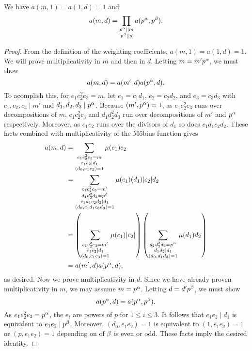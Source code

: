 \documentclass[12pt,reqno,oneside]{amsart}
\begin{document}
    \begin{proposition}\label{prop:multiplicativity_of_weighting_coefficients}
        We have $a(m,1) = a(1,d) = 1$ and
        \[
            a(m,d) = \prod_{\substack{p^{\alpha} \mid\mid m \\ p^{\beta} \mid\mid d}}a(p^{\alpha},p^{\beta}).
        \]
    \end{proposition}
    \begin{proof}
        From the definition of the weighting coefficients, $a(m,1) = a(1,d) = 1$. We will prove multiplicativity in $m$ and then in $d$. Letting $m = m'p^{\alpha}$, we must show
        \[
            a(m,d) = a(m',d)a(p^{\alpha},d).
        \]
        To acomplish this, for $e_{1}e_{2}^{2}e_{3} = m$, let $e_{1} = c_{1}d_{1}$, $e_{2} = c_{2}d_{2}$, and $e_{3} = c_{3}d_{3}$ with $c_{1},c_{2},c_{3} \mid m'$ and $d_{1},d_{2},d_{3} \mid p^{\alpha}$. Because $(m',p^{\alpha}) = 1$, as $e_{1}e_{2}^{2}e_{3}$ runs over decompositions of $m$, $c_{1}c_{2}^{2}c_{3}$ and $d_{1}d_{2}^{2}d_{3}$ run over decompositions of $m'$ and $p^{\alpha}$ respectively. Moreover, as $e_{1}e_{2}$ runs over the divisors of $d_{1}$ so does $c_{1}d_{1}c_{2}d_{2}$. These facts combined with multiplicativity of the M\"obius function gives
        \begin{align*}
            a(m,d) &= \sum_{\substack{e_{1}e_{2}^{2}e_{3} = m \\ e_{1}e_{2} \mid d_{1} \\ (d_{0},e_{1}e_{3}) = 1}}\mu(e_{1})e_{2} \\
            &= \sum_{\substack{c_{1}c_{2}^{2}c_{3} = m' \\ d_{1}d_{2}^{2}d_{3} = p^{\beta} \\ c_{1}d_{1}c_{2}d_{2} \mid d_{1} \\ (d_{0},c_{1}d_{1}c_{3}d_{3}) = 1}}\mu(c_{1})(d_{1})|c_{2}|d_{2} \\
            &= \left(\sum_{\substack{c_{1}c_{2}^{2}c_{3} = m' \\ c_{1}c_{2} \mid d_{1} \\ (d_{0},c_{1}c_{3}) = 1}}\mu(c_{1})|c_{2}|\right)\left(\sum_{\substack{d_{1}d_{2}^{2}d_{3} = p^{\alpha} \\ d_{1}d_{2} \mid d_{1} \\ (d_{0},d_{1}d_{3}) = 1}}\mu(d_{1})d_{2}\right) \\
            &= a(m',d)a(p^{\alpha},d),
        \end{align*}
        as desired. Now we prove multiplicativity in $d$. Since we have already proven multiplicativity in $m$, we may assume $m = p^{\alpha}$. Letting $d = d'p^{\beta}$, we must show
        \[
            a(p^{\alpha},d) = a(p^{\alpha},p^{\beta}).
        \]
        As $e_{1}e_{2}^{2}e_{3} = p^{\alpha}$, the $e_{i}$ are powers of $p$ for $1 \le i \le 3$. It follows that $e_{1}e_{2} \mid d_{1}$ is equivalent to $e_{1}e_{2} \mid p^{\beta}$. Moreover, $(d_{0},e_{1}e_{2}) = 1$ is equivalent to $(1,e_{1}e_{2}) = 1$ or $(p,e_{1}e_{2}) = 1$ depending on of $\beta$ is even or odd. These facts imply the desired identity.
    \end{proof}
\end{document}
